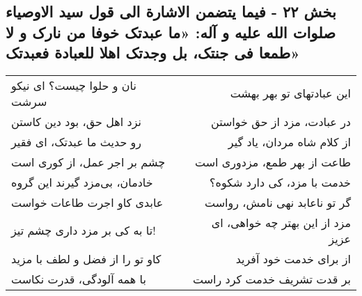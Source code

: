 \begin{center}
\section*{بخش ۲۲ - فیما یتضمن الاشارة الی قول سید الاوصیاء صلوات الله علیه و آله: «ما عبدتک خوفا من نارک و لا طمعا فی جنتک، بل وجدتک اهلا للعبادة فعبدتک»}
\label{sec:022}
\begin{longtable}{l p{0.5cm} r}
نان و حلوا چیست؟ ای نیکو سرشت
&&
این عبادتهای تو بهر بهشت
\\
نزد اهل حق، بود دین کاستن
&&
در عبادت، مزد از حق خواستن
\\
رو حدیث ما عبدتک، ای فقیر
&&
از کلام شاه مردان، یاد گیر
\\
چشم بر اجر عمل، از کوری است
&&
طاعت از بهر طمع، مزدوری است
\\
خادمان، بی‌مزد گیرند این گروه
&&
خدمت با مزد، کی دارد شکوه؟
\\
عابدی کاو اجرت طاعات خواست
&&
گر تو ناعابد نهی نامش، رواست
\\
تا به کی بر مزد داری چشم تیز!
&&
مزد از این بهتر چه خواهی، ای عزیز
\\
کاو تو را از فضل و لطف با مزید
&&
از برای خدمت خود آفرید
\\
با همه آلودگی، قدرت نکاست
&&
بر قدت تشریف خدمت کرد راست
\\
\end{longtable}
\end{center}
